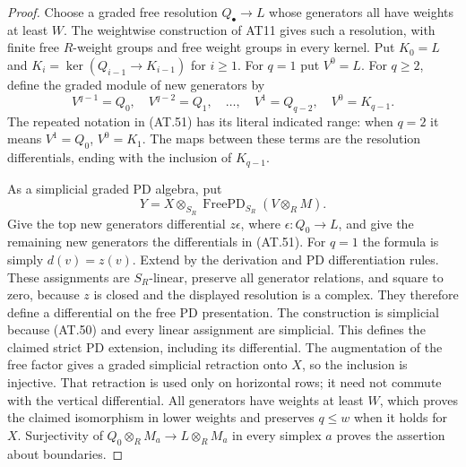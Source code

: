 \begin{proof}
Choose a graded free resolution $Q_\bullet\to L$
whose generators all have weights at least $W$.
The weightwise construction of AT11 gives such a
resolution, with finite free $R$-weight groups and
free weight groups in every kernel.  Put $K_0=L$
and $K_i=\ker(Q_{i-1}\to K_{i-1})$ for $i\geq1$.
For $q=1$ put $V^0=L$.
For $q\geq2$, define the graded module of new
generators by
\[
 V^{q-1}=Q_0,\quad V^{q-2}=Q_1,\quad\ldots,
 \quad V^1=Q_{q-2},\quad V^0=K_{q-1}.
 \tag{AT.51}
\]
The repeated notation in \textup{(AT.51)} has its
literal indicated range: when $q=2$ it means
$V^1=Q_0$, $V^0=K_1$.
The maps between these terms are the resolution
differentials, ending with the inclusion of $K_{q-1}$.

As a simplicial graded PD algebra, put
\[
 Y=X\otimes_{S_R}\operatorname{FreePD}_{S_R}(V\otimes_R M).
 \tag{AT.52}
\]
Give the top new generators differential $z\epsilon$,
where $\epsilon:Q_0\to L$, and give the remaining
new generators the differentials in \textup{(AT.51)}.
For $q=1$ the formula is simply $d(v)=z(v)$.
Extend by the derivation and PD differentiation rules.
These assignments are $S_R$-linear, preserve all
generator relations, and square to zero, because
$z$ is closed and the displayed resolution is a
complex.  They therefore define a differential on
the free PD presentation.  The construction is
simplicial because \textup{(AT.50)} and every linear
assignment are simplicial.  This defines the
claimed strict PD extension, including its differential.
The augmentation of the free factor gives a graded
simplicial retraction onto $X$, so the inclusion is
injective.  That retraction is used only on horizontal
rows; it need not commute with the vertical differential.
All generators have weights at least $W$, which proves
the claimed isomorphism in lower weights and preserves
$q\leq w$ when it holds for $X$.
Surjectivity of $Q_0\otimes_R M_a\to L\otimes_R M_a$
in every simplex $a$ proves the assertion about boundaries.


\end{proof}
